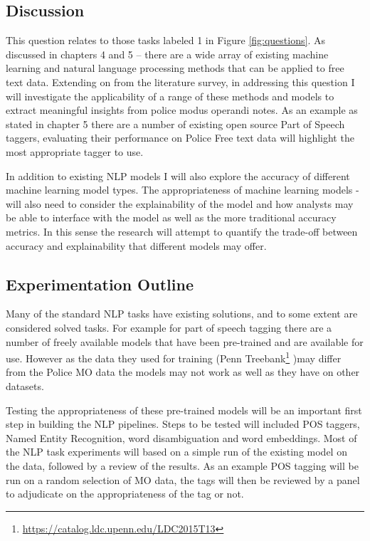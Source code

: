\subsection{Discussion}

This question relates to those tasks labeled 1 in Figure \ref{fig:questions}. As discussed in chapters 4 and 5 – there are a wide array of existing machine learning and natural language processing methods that can be applied to free text data. Extending on from the literature survey, in addressing this question I will investigate the applicability of a range of these methods and models to extract meaningful insights from police modus operandi notes. As an example as stated in chapter 5 there are a number of existing open source Part of Speech taggers, evaluating their performance on Police Free text data will highlight the most appropriate tagger to use. 

In addition to existing NLP models I will also explore the accuracy of different machine learning model types. The appropriateness of machine learning models - will also need to consider the explainability of the model and how analysts may be able to interface with the model as well as the more traditional accuracy metrics. In this sense the research will  attempt to quantify the trade-off between accuracy and explainability that different models may offer.


\subsection{Experimentation Outline}Many of the standard NLP tasks have existing solutions, and to some extent are considered solved tasks. For example for part of speech tagging there are a number of freely available models \parencite{toutanova2003feature} that have been pre-trained and are available for use. However as the data they used for training (Penn Treebank\footnote{\protect\url{https://catalog.ldc.upenn.edu/LDC2015T13}} )may differ from the Police MO data the models may not work as well as they have on other datasets. 

Testing the appropriateness of these pre-trained models will be an important first step in building the NLP pipelines. Steps to be tested will included POS taggers, Named Entity Recognition, word disambiguation and word embeddings. Most of the NLP task experiments will based on a simple run of the existing model on the data, followed by a review of the results. As an example POS tagging will be run on a random selection of MO data, the tags will then be reviewed by a panel to adjudicate on the appropriateness of the tag or not.

